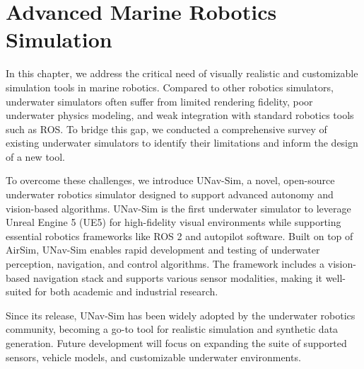 \chapter{Advanced Marine Robotics Simulation}
In this chapter, we address the critical need of visually realistic and customizable simulation tools in marine robotics. Compared to other robotics simulators, underwater simulators often suffer from limited rendering fidelity, poor underwater physics modeling, and weak integration with standard robotics tools such as ROS. To bridge this gap, we conducted a comprehensive survey of existing underwater simulators to identify their limitations and inform the design of a new tool.

To overcome these challenges, we introduce UNav-Sim, a novel, open-source underwater robotics simulator designed to support advanced autonomy and vision-based algorithms. UNav-Sim is the first underwater simulator to leverage Unreal Engine 5 (UE5) for high-fidelity visual environments while supporting essential robotics frameworks like ROS 2 and autopilot software. Built on top of AirSim, UNav-Sim enables rapid development and testing of underwater perception, navigation, and control algorithms. The framework includes a vision-based navigation stack and supports various sensor modalities, making it well-suited for both academic and industrial research.

Since its release, UNav-Sim has been widely adopted by the underwater robotics community, becoming a go-to tool for realistic simulation and synthetic data generation. Future development will focus on expanding the suite of supported sensors, vehicle models, and customizable underwater environments.